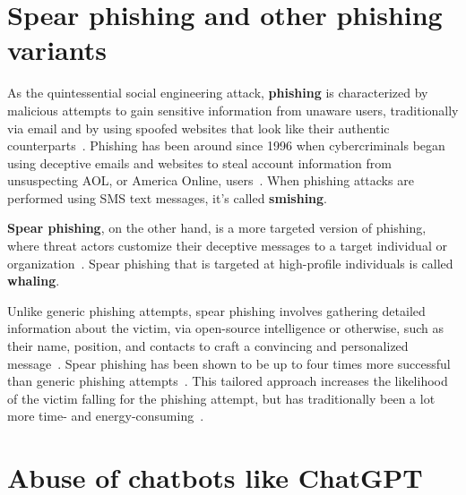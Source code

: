 \section{Spear phishing and other phishing variants}
\begin{comment}
\end{comment}


%
%
As the quintessential social engineering attack, \textbf{phishing} is characterized by malicious attempts to gain sensitive information from unaware users, traditionally via email and by using spoofed websites that look like their authentic counterparts~\citep{basit_Comprehensive_Survey_AI_Phishing_Detection_2021}. Phishing has been around since 1996 when cybercriminals began using deceptive emails and websites to steal account information from unsuspecting AOL, or America Online, users~\citep{wang_Defining_Social_Engineering_2020}. When phishing attacks are performed using SMS text messages, it’s called \textbf{smishing}.


%
%
\textbf{Spear phishing}, on the other hand, is a more targeted version of phishing, where threat actors customize their deceptive messages to a target individual or organization~\citep{fakhouri_AI_Driven_Solutions_SE_Attacks_2024}. Spear phishing that is targeted at high-profile individuals is called \textbf{whaling}.


%
%
Unlike generic phishing attempts, spear phishing involves gathering detailed information about the victim, via open-source intelligence or otherwise, such as their name, position, and contacts to craft a convincing and personalized message~\citep{wang_Defining_Social_Engineering_2020}. Spear phishing has been shown to be up to four times more successful than generic phishing attempts~\citep{king_AI_Crime_Interdisciplinary_Analysis_2019}. This tailored approach increases the likelihood of the victim falling for the phishing attempt, but has traditionally been a lot more time- and energy-consuming~\citep {mirsky_Threat_Offensive_AI_Organizations_2023}.






\section{Abuse of chatbots like ChatGPT}
\begin{comment}
\end{comment}

